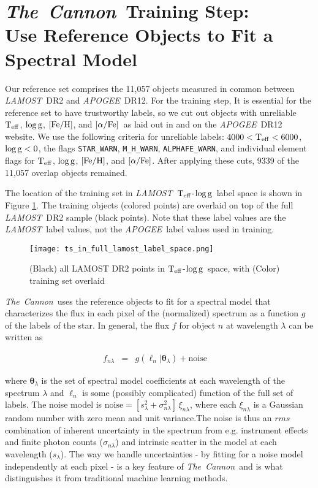 \documentclass[12pt, preprint]{aastex}
\newcommand{\tc}{\textsl{The~Cannon}}
\newcommand{\apogee}{\textsl{APOGEE}}
\newcommand{\lamost}{\textsl{LAMOST}}
\newcommand{\set}[1]{\bm{#1}}
\newcommand{\teff}{\mbox{$\rm T_{eff}$}}
\newcommand{\feh}{\mbox{$\rm [Fe/H]$}}
\newcommand{\alphafe}{\mbox{$\rm [\alpha/Fe]$}}
\newcommand{\logg}{\mbox{$\rm \log g$}}
\newcommand{\starlabel}{\ell}
\newcommand{\starlabelvec}{\set{\starlabel}}
\begin{document}
\section{\tc\ Training Step: \\ Use Reference Objects to Fit a Spectral Model}

Our reference set comprises the 11,057 objects measured in common between
\lamost\ DR2 and \apogee\ DR12. 
For the training step, It is essential for the reference set to have trustworthy labels, 
so we cut out objects with unreliable \teff, \logg, \feh, and \alphafe\ as laid out in 
\citet{Holtzman2015} and on the \apogee\ DR12 website. We use the 
following criteria for unreliable labels: $4000 < \teff < 6000$, $\logg < 0$,  
the flags \texttt{STAR\_WARN}, \texttt{M\_H\_WARN}, \texttt{ALPHAFE\_WARN}, and individual
element flags for \teff, \logg, \feh, and \alphafe. 
After applying these cuts, 9339 of the 11,057 overlap objects remained. 

The location of the training set in \lamost\ \teff-\logg\ label space is shown in 
Figure \ref{fig:training-set-label-space}. The training objects (colored points)
are overlaid on top of the full \lamost\ DR2 sample (black points). Note
that these label values are the \lamost\ label values, not the \apogee\ label
values used in training. 

\begin{figure}[h!]
\centering
\texttt{[image: ts\_in\_full\_lamost\_label\_space.png]}
\caption{(Black) all LAMOST DR2 points in \teff-\logg\ space, with (Color) training set overlaid}
\label{fig:training-set-label-space}
\end{figure}

\tc\ uses the reference objects to fit for a spectral model that characterizes the flux
in each pixel of the (normalized) spectrum as a function $g$ of the labels of the star. 
In general, the flux $f$ for object $n$ at wavelength $\lambda$ can be written as

\begin{eqnarray}
f_{n\lambda} &=&
g(\starlabelvec_n |  \set{\theta}_\lambda) + \mbox{noise}
\label{eq:specmodel}\quad 
\end{eqnarray}

\noindent where $\set{\theta}_\lambda$ is the set of 
spectral model coefficients at each wavelength of the spectrum $\lambda$ and
$\starlabelvec_n$ is some (possibly complicated) function of the full set of labels. 
The noise model is $\mbox{noise} = [s_\lambda^2+ \sigma_{n\lambda}^2]\,\xi_{n\lambda}$,
where each $\xi_{n\lambda}$ is a Gaussian random number with zero mean and unit
variance.The noise is thus an $rms$ combination of inherent uncertainty in the spectrum
from e.g. instrument effects and finite photon counts ($\sigma_{n\lambda}$) and 
intrinsic scatter in the model at each wavelength ($s_\lambda$). 
The way we handle uncertainties - by fitting for a noise model
independently at each pixel - is a key feature of \tc\ and is what 
distinguishes it from traditional machine learning
methods. 
\end{document}
